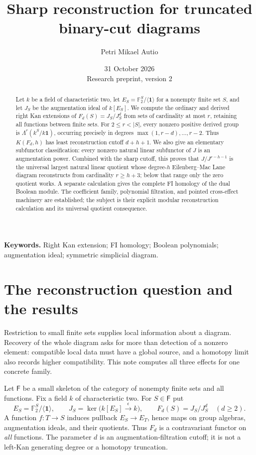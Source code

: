 \documentclass[11pt,a4paper]{article}
\title{Sharp reconstruction for truncated binary-cut diagrams}
\author{Petri Mikael Autio}
\date{31 October 2026\\\small Research preprint, version 2}
\theoremstyle{definition}
\theoremstyle{remark}
\newcommand{\F}{\mathsf F}
\newcommand{\Ftwo}{\mathbb F_2}
\newcommand{\one}{\mathbf 1}
\begin{document}
\maketitle
\begin{abstract}
Let $k$ be a field of characteristic two, let $E_S=\Ftwo^S/\langle\one\rangle$ for a nonempty finite set $S$, and let $J_S$ be the augmentation ideal of $k[E_S]$. We compute the ordinary and derived right Kan extensions of $F_d(S)=J_S/J_S^d$ from sets of cardinality at most $r$, retaining all functions between finite sets. For $2\le r<|S|$, every nonzero positive derived group is $\Lambda^r(k^S/k\one)$, occurring precisely in degrees $\max(1,r-d),\ldots,r-2$. Thus $K(F_d,h)$ has least reconstruction cutoff $d+h+1$. We also give an elementary subfunctor classification: every nonzero natural linear subfunctor of $J$ is an augmentation power. Combined with the sharp cutoff, this proves that $J/J^{r-h-1}$ is the universal largest natural linear quotient whose degree-$h$ Eilenberg--Mac Lane diagram reconstructs from cardinality $r\ge h+3$; below that range only the zero quotient works. A separate calculation gives the complete FI homology of the dual Boolean module. The coefficient family, polynomial filtration, and pointed cross-effect machinery are established; the subject is their explicit modular reconstruction calculation and its universal quotient consequence.
\end{abstract}
\noindent\textbf{Keywords.} Right Kan extension; FI homology; Boolean polynomials; augmentation ideal; symmetric simplicial diagram.

\section{The reconstruction question and the results}

Restriction to small finite sets supplies local information about a diagram. Recovery of the whole diagram asks for more than detection of a nonzero element: compatible local data must have a global source, and a homotopy limit also records higher compatibility. This note computes all three effects for one concrete family.

Let $\F$ be a small skeleton of the category of nonempty finite sets and all functions. Fix a field $k$ of characteristic two. For $S\in\F$ put
\[
 E_S=\Ftwo^S/\langle\one\rangle,
 \qquad J_S=\ker\bigl(k[E_S]\xrightarrow{\epsilon}k\bigr),
 \qquad F_d(S)=J_S/J_S^d\quad(d\ge2).
\]
A function $f:T\to S$ induces pullback $E_S\to E_T$, hence maps on group algebras, augmentation ideals, and their quotients. Thus $F_d$ is a contravariant functor on \emph{all} functions. The parameter $d$ is an augmentation-filtration cutoff; it is not a left-Kan generating degree or a homotopy truncation.
\end{document}
